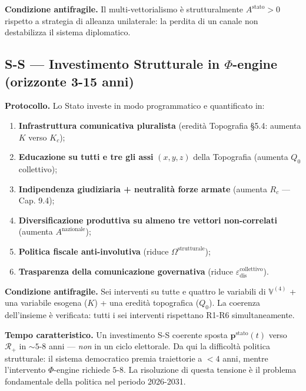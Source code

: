 \Proved{} \textbf{Condizione antifragile.} Il multi-vettorialismo è
strutturalmente \(A^{\text{stato}} > 0\) rispetto a strategia di
alleanza unilaterale: la perdita di un canale non destabilizza il
sistema diplomatico.

\subsection{\texorpdfstring{S-S --- Investimento Strutturale in
\(\Phi\)-engine (orizzonte 3-15
anni)}{S-S --- Investimento Strutturale in \textbackslash Phi-engine (orizzonte 3-15 anni)}}\label{s-s-investimento-strutturale-in-phi-engine-orizzonte-3-15-anni}

\Hypoth{} \textbf{Protocollo.} Lo Stato investe in modo programmatico e
quantificato in:

\begin{enumerate}
\def\labelenumi{\arabic{enumi}.}
\tightlist
\item
  \textbf{Infrastruttura comunicativa pluralista} (eredità Topografia
  \S{}5.4: aumenta \(K\) verso \(K_c\));
\item
  \textbf{Educazione su tutti e tre gli assi} \((x, y, z)\) della
  Topografia (aumenta \(Q_0\) collettivo);
\item
  \textbf{Indipendenza giudiziaria + neutralità forze armate} (aumenta
  \(R_c\) --- Cap. 9.4);
\item
  \textbf{Diversificazione produttiva su almeno tre vettori
  non-correlati} (aumenta \(A^{\text{nazionale}}\));
\item
  \textbf{Politica fiscale anti-involutiva} (riduce
  \(\Omega^{\text{strutturale}}\));
\item
  \textbf{Trasparenza della comunicazione governativa} (riduce
  \(\varepsilon_{\text{dis}}^{\text{collettivo}}\)).
\end{enumerate}

\Proved{} \textbf{Condizione antifragile.} Sei interventi su tutte e
quattro le variabili di \(\mathbb{V}^{(4)}\) + una variabile esogena
(\(K\)) + una eredità topografica (\(Q_0\)). La coerenza dell'insieme è
verificata: tutti i sei interventi rispettano R1-R6 simultaneamente.

\Hypoth{} \textbf{Tempo caratteristico.} Un investimento S-S coerente
sposta \(\boldsymbol{p}^{\text{stato}}(t)\) verso \(\mathcal{R}_+\) in
\(\sim 5\)-\(8\) anni --- \emph{non} in un ciclo elettorale. Da qui la
difficoltà politica strutturale: il sistema democratico premia
traiettorie a \(< 4\) anni, mentre l'intervento \(\Phi\)-engine richiede
\(5\)-\(8\). La risoluzione di questa tensione è il problema
fondamentale della politica nel periodo 2026-2031.



